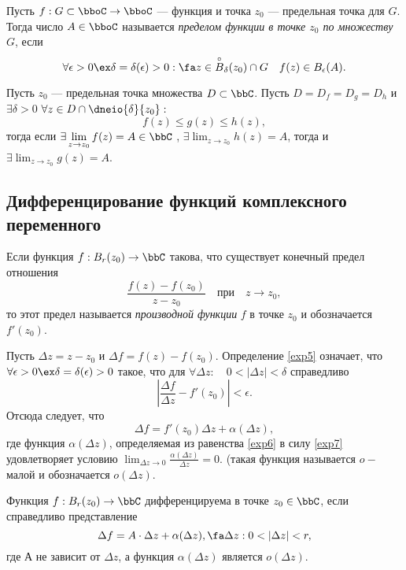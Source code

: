 \begin{defn}
Пусть $f: G\subset \bboC \to \bboC$ --- функция и точка $z_0$ --- предельная точка для $G$. Тогда число $A \in \bboC$ называется \textit{пределом функции в точке $z_0$ по множеству $G$}, если 
$$
\forall \epsilon > 0 \ex \delta = \delta(\epsilon)>0:\fa z \in \overset{\circ} {B}_\delta(z_0)\cap G \quad f(z) \in B_\epsilon(A). 
$$ 
\end{defn}

\begin{thm} 
\label{exp14}
Пусть $z_0$ --- предельная точка множества $D\subset \bbC$. Пусть $D = D_f=D_g=D_h$ и $\exists \delta > 0$ $\forall z \in D \cap \dneio{\delta}{z_0}:$
$$f(z)\le g(z) \le h(z),$$ тогда если $\exists \lim_{z \to z_0}\limits f(z) = A \in \bbC$ , $\exists \lim_{z \to z_0}\limits h(z) = A$, тогда и $\exists \lim_{z \to z_0}\limits g(z) = A$.
\end{thm}

\subsection{Дифференцирование функций комплексного переменного}
\begin{defn}
\label{exp5}
Если функция  $f : B_r(z_0) \to \bbC $ такова, что существует конечный предел отношения
$$
\frac{f(z)-f(z_0)}{z-z_0} \quad\text{при}\quad z \to z_0,
$$
то этот предел называется \textit{производной функции} $f$ в точке $z_0$ и обозначается $f'(z_0)$. 
\end{defn}
Пусть $\Delta z = z - z_0$ и $\Delta f = f(z) - f(z_0)$. Определение \ref{exp5} означает, что $\forall \epsilon > 0 \ex \delta=\delta(\epsilon)>0$ такое, что для $\forall \Delta z:\quad 0 <|\Delta z| <\delta$ справедливо 
\begin{equation}
\label{exp7}
\left|\frac{\Delta f}{\Delta z} - f'(z_0) \right| < \epsilon.
\end{equation}
Отсюда следует, что 
\begin{equation}
\label{exp6}
\Delta f = f'(z_0)\Delta z + \alpha(\Delta z),
\end{equation}
где функция $\alpha(\Delta z)$, определяемая из равенства \eqref{exp6} в силу \eqref{exp7} удовлетворяет условию $\lim_{\Delta z \to 0}\limits \frac{\alpha(\Delta z)}{\Delta z} = 0$. (такая функция называется $o-$малой и обозначается $o(\Delta z)$.

\begin{defn}
Функция $f : B_r(z_0) \to \bbC $ дифференцируема в точке $z_0 \in \bbC$, если справедливо представление 
\begin{equation}
\label{exp4}
\Delta f = A\cdot \Delta z + \alpha(\Delta z), \fa \Delta z: 0 < |\Delta z|< r,
\end{equation}
где А не зависит от $\Delta z$, а функция $\alpha(\Delta z)$ является $o(\Delta z)$.
\end{defn}

